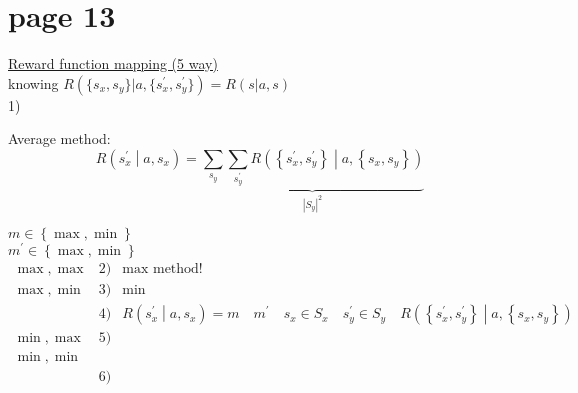 \section*{page 13}

\underline{Reward function mapping (5 way)}\\

knowing $R\left(\{s_x, s_y\}|a, \{s^\prime_x,s^\prime_y\}\right)=R(s|a,s)$\\

1)\ 
\begin{minipage}[t]{0.9\textwidth}Average method:\\
\begin{equation*}
R\left(s^\prime_x\middle|a,s_x\right)=\underbrace{\sum_{s_y}\sum_{s^\prime_y}R\left(\left\{s^\prime_x,s^\prime_y\right\}\middle|a,\left\{s_x,s_y\right\}\right)}_{\left|S_y\right|^2}
\end{equation*}
\end{minipage}

$m\in \left\{ \max,\min\right\}$\\
$m^\prime\in \left\{ \max, \min \right\}$\\

\begin{equation*}
\begin{array}{lcl}
\max, \max & 2) & \text{max method!}  \\ 
\max, \min & 3)& \min \\
& 4)& R\left( s^\prime_x\middle|a, s_x \right) = m\quad m^\prime\quad s_x\in S_x\quad s^\prime_y\in S_y \quad
R\left( \left\{s^\prime_x,s^\prime_y\right\}\middle|a, \left\{ s_x, s_y \right\}\right)
\\
\min, \max & 5) & \\
\min, \min  & & \\
& 6) &
\end{array}
\end{equation*}